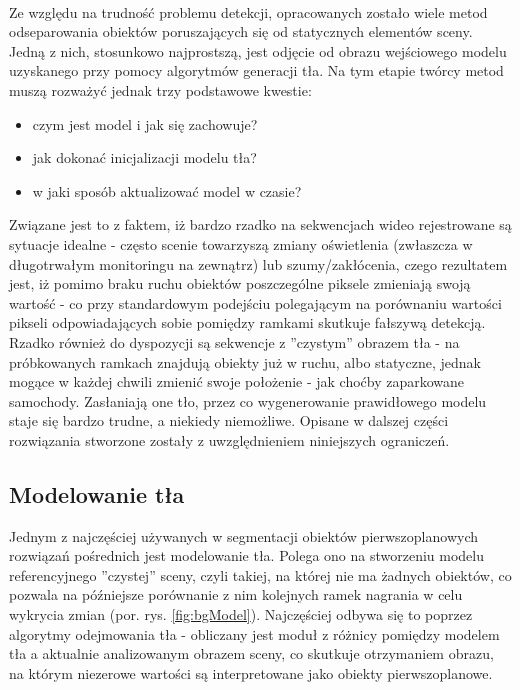 \paragraph{}
Ze względu na trudność problemu detekcji, opracowanych zostało wiele metod odseparowania obiektów poruszających się od statycznych elementów sceny. Jedną z nich, stosunkowo najprostszą, jest odjęcie od obrazu wejściowego modelu uzyskanego przy pomocy algorytmów generacji tła. Na tym etapie twórcy metod muszą rozważyć jednak trzy podstawowe kwestie:
\begin{itemize}
\item czym jest model i jak się zachowuje?
\item jak dokonać inicjalizacji modelu tła?
\item w jaki sposób aktualizować model w czasie?
\end{itemize}
Związane jest to z faktem, iż bardzo rzadko na sekwencjach wideo rejestrowane są sytuacje idealne - często scenie towarzyszą zmiany oświetlenia (zwłaszcza w długotrwałym monitoringu na zewnątrz) lub szumy/zakłócenia, czego rezultatem jest, iż pomimo braku ruchu obiektów poszczególne piksele zmieniają swoją wartość - co przy standardowym podejściu polegającym na porównaniu wartości pikseli odpowiadających sobie pomiędzy ramkami skutkuje fałszywą detekcją. Rzadko również do dyspozycji są sekwencje z ''czystym'' obrazem tła - na próbkowanych ramkach znajdują obiekty już w ruchu, albo statyczne, jednak mogące w każdej chwili zmienić swoje położenie - jak choćby zaparkowane samochody. Zasłaniają one tło, przez co wygenerowanie prawidłowego modelu staje się bardzo trudne, a niekiedy niemożliwe. Opisane w dalszej części rozwiązania stworzone zostały z uwzględnieniem niniejszych ograniczeń.
\subsection{Modelowanie tła}
Jednym z najczęściej używanych w segmentacji obiektów pierwszoplanowych rozwiązań pośrednich jest modelowanie tła. Polega ono na stworzeniu modelu referencyjnego ''czystej'' sceny, czyli takiej, na której nie ma żadnych obiektów, co pozwala na późniejsze porównanie z nim kolejnych ramek nagrania w celu wykrycia zmian (por. rys. \ref{fig:bgModel}). Najczęściej odbywa się to poprzez algorytmy odejmowania tła - obliczany jest moduł z różnicy pomiędzy modelem tła a aktualnie analizowanym obrazem sceny, co skutkuje otrzymaniem obrazu, na którym niezerowe wartości są interpretowane jako obiekty pierwszoplanowe.
